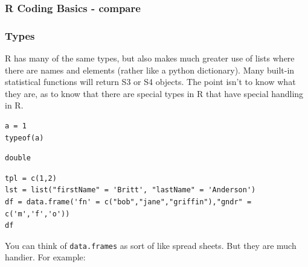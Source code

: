 \documentclass{article}
\begin{document}
\subsubsection{R Coding Basics - compare}
\label{sec:orgc497244}
\subsubsection{Types}
\label{sec:orge7ca28d}
R has many of the same types, but also makes much greater use of lists where there are names and elements (rather like a python dictionary). Many built-in statistical functions will return S3 or S4 objects. The point isn't to know what they are, as to know that there are special types in R that have special handling in R.

\begin{verbatim}
a = 1
typeof(a)
\end{verbatim}

\begin{verbatim}
double
\end{verbatim}


\begin{verbatim}
tpl = c(1,2)
lst = list("firstName" = 'Britt', "lastName" = 'Anderson')
df = data.frame('fn' = c("bob","jane","griffin"),"gndr" = c('m','f','o'))
df
\end{verbatim}


You can think of \texttt{data.frames} as sort of like spread sheets. But they are much handier. For example:
\end{document}
